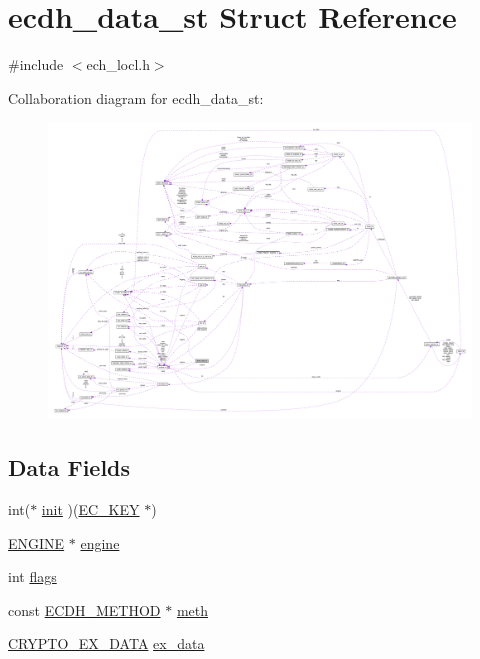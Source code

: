 \hypertarget{structecdh__data__st}{}\section{ecdh\+\_\+data\+\_\+st Struct Reference}
\label{structecdh__data__st}


{\ttfamily \#include $<$ech\+\_\+locl.\+h$>$}



Collaboration diagram for ecdh\+\_\+data\+\_\+st\+:\nopagebreak
\begin{figure}[H]
\begin{center}
\leavevmode
\includegraphics[width=350pt]{structecdh__data__st__coll__graph}
\end{center}
\end{figure}
\subsection*{Data Fields}
\begin{DoxyCompactItemize}
\item 
int($\ast$ \hyperlink{structecdh__data__st_abe4cc01385a304b13c23583b069cba3f}{init} )(\hyperlink{crypto_2ec_2ec_8h_a756878ae60b2fc17d4217e77ffe5e0d3}{E\+C\+\_\+\+K\+EY} $\ast$)
\item 
\hyperlink{crypto_2ossl__typ_8h_abac45b251498719318e60ab8d6192510}{E\+N\+G\+I\+NE} $\ast$ \hyperlink{structecdh__data__st_a4eb35fa252ec72ad7c53a4c8d30a7fd3}{engine}
\item 
int \hyperlink{structecdh__data__st_ac8bf36fe0577cba66bccda3a6f7e80a4}{flags}
\item 
const \hyperlink{crypto_2ossl__typ_8h_a74538ccc9d4d6edd4f0e7ccaa99c4064}{E\+C\+D\+H\+\_\+\+M\+E\+T\+H\+OD} $\ast$ \hyperlink{structecdh__data__st_add3e766f3448fe1d0f36b8528f44d91a}{meth}
\item 
\hyperlink{crypto_2ossl__typ_8h_a7eaff1c18057495d8af18f22d1370b51}{C\+R\+Y\+P\+T\+O\+\_\+\+E\+X\+\_\+\+D\+A\+TA} \hyperlink{structecdh__data__st_ac3e4fd59d6ee44a81f3a58114613c1e2}{ex\+\_\+data}
\end{DoxyCompactItemize}


